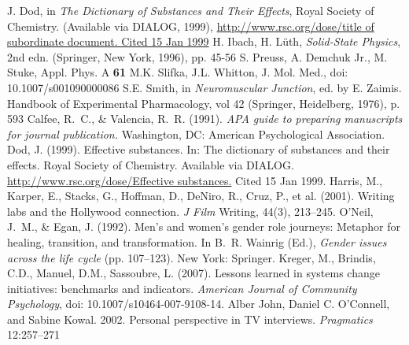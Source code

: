 \begin{thebibliography}{99.}
%
 J. Dod, in \textit{The Dictionary of Substances and Their Effects}, Royal Society of Chemistry. (Available via DIALOG, 1999), 
\url{http://www.rsc.org/dose/title of subordinate document. Cited 15 Jan 1999}
%
 H. Ibach, H. L\"uth, \textit{Solid-State Physics}, 2nd edn. (Springer, New York, 1996), pp. 45-56 
%
 S. Preuss, A. Demchuk Jr., M. Stuke, Appl. Phys. A \textbf{61}
%
 M.K. Slifka, J.L. Whitton, J. Mol. Med., doi: 10.1007/s001090000086
%
 S.E. Smith, in \textit{Neuromuscular Junction}, ed. by E. Zaimis. Handbook of Experimental Pharmacology, vol 42 (Springer, Heidelberg, 1976), p. 593
%
\bigskip
%
%
%
 Calfee, R.~C., \& Valencia, R.~R. (1991). \textit{APA guide to preparing manuscripts for journal publication.} Washington, DC: American Psychological Association.
%
 Dod, J. (1999). Effective substances. In: The dictionary of substances and their effects. Royal Society of Chemistry. Available via DIALOG. \\
\url{http://www.rsc.org/dose/Effective substances.} Cited 15 Jan 1999.
%
 Harris, M., Karper, E., Stacks, G., Hoffman, D., DeNiro, R., Cruz, P., et al. (2001). Writing labs and the Hollywood connection. \textit{J Film} Writing, 44(3), 213--245.
%
 O'Neil, J.~M., \& Egan, J. (1992). Men's and women's gender role journeys: Metaphor for healing, transition, and transformation. In B.~R. Wainrig (Ed.), \textit{Gender issues across the life cycle} (pp. 107--123). New York: Springer.
%
Kreger, M., Brindis, C.D., Manuel, D.M., Sassoubre, L. (2007). Lessons learned in systems change initiatives: benchmarks and indicators. \textit{American Journal of Community Psychology}, doi: 10.1007/s10464-007-9108-14.
%
%
%
\bigskip
%
 Alber John, Daniel C. O'Connell, and Sabine Kowal. 2002. Personal perspective in TV interviews. \textit{Pragmatics} 12:257--271

\end{thebibliography}
